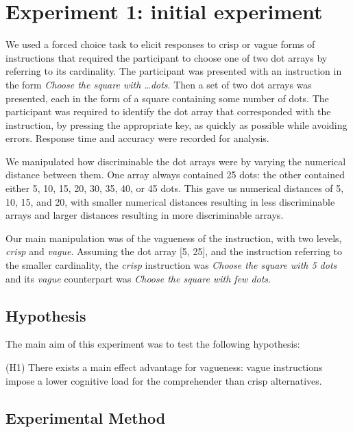 \documentclass[%
man,		%
floatsintext,%
apacite%
]{apa6}
\begin{document}
\section{Experiment 1: initial experiment} 

We used a forced choice task to elicit responses to crisp or vague forms of instructions that required the participant to choose one of two dot arrays by referring to its cardinality. The participant was presented with an instruction in the form \emph{Choose the square with \ldots dots}. Then a set of two dot arrays was presented, each in the form of a square containing some number of dots. 
The participant was required to identify the dot array that corresponded with the instruction, by pressing the appropriate key, as quickly as possible while avoiding errors. 
Response time and accuracy were recorded for analysis. 

We manipulated how discriminable the dot arrays were by varying the numerical distance between them. 
One array always contained 25 dots: the other contained either 5, 10, 15, 20, 30, 35, 40, or 45 dots. 
This gave us numerical distances of 5, 10, 15, and 20, with smaller numerical distances resulting in less discriminable arrays and larger distances resulting in more discriminable arrays. 

Our main manipulation was of the vagueness of the instruction, with two levels, \emph{crisp} and \emph{vague}.
Assuming the dot array [5, 25], and the instruction referring to the smaller cardinality, the \emph{crisp} instruction was \emph{Choose the square with 5 dots} and its \emph{vague} counterpart was \emph{Choose the square with few dots}. 

\subsection{Hypothesis}
\noindent The main aim of this experiment was to test the following hypothesis:
{\small
\begin{APAenumerate}
	\item [(H1)] There exists a main effect advantage for vagueness: vague instructions impose a lower cognitive load for the comprehender than crisp alternatives.
\end{APAenumerate}
}

\subsection{Experimental Method}
\end{document}

